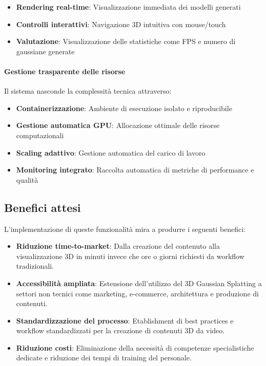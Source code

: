 \begin{itemize}
\item \textbf{Rendering real-time}: Visualizzazione immediata dei modelli generati
\item \textbf{Controlli interattivi}: Navigazione 3D intuitiva con mouse/touch
\item \textbf{Valutazione}: Visualizzazione delle statistiche come FPS e numero di gaussiane generate
\end{itemize}

\paragraph{Gestione trasparente delle risorse}
Il sistema nasconde la complessità tecnica attraverso:

\begin{itemize}
\item \textbf{Containerizzazione}: Ambiente di esecuzione isolato e riproducibile
\item \textbf{Gestione automatica GPU}: Allocazione ottimale delle risorse computazionali
\item \textbf{Scaling adattivo}: Gestione automatica del carico di lavoro
\item \textbf{Monitoring integrato}: Raccolta automatica di metriche di performance e qualità
\end{itemize}

\subsection{Benefici attesi}

L'implementazione di queste funzionalità mira a produrre i seguenti benefici:
\begin{itemize}
    \item \textbf{Riduzione time-to-market}: Dalla creazione del contenuto alla visualizzazione 3D in minuti invece che ore o giorni richiesti da workflow tradizionali.
    \item \textbf{Accessibilità ampliata}: Estensione dell'utilizzo del 3D Gaussian Splatting a settori non tecnici come marketing, e-commerce, architettura e produzione di contenuti.
    \item \textbf{Standardizzazione del processo}: Etablishment di best practices e workflow standardizzati per la creazione di contenuti 3D da video.
    \item \textbf{Riduzione costi}: Eliminazione della necessità di competenze specialistiche dedicate e riduzione dei tempi di training del personale.
\end{itemize}

